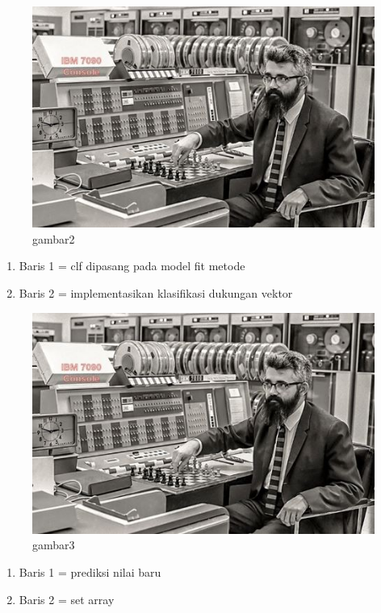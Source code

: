 \begin{figure}[ht]
\centering
\includegraphics[scale=0.7]{figures/contoh.jpg}
\caption{gambar2}
\label{roza2}
\end{figure}

\begin {enumerate}
\item Baris 1 = clf dipasang pada model fit metode
\item Baris 2 =  implementasikan klasifikasi dukungan vektor
\end {enumerate}

\begin{figure}[ht]
\centering
\includegraphics[scale=0.5]{figures/contoh.jpg}
\caption{gambar3}
\label{roza3}
\end{figure}

\begin {enumerate}
\item Baris 1 = prediksi nilai baru
\item Baris 2 = set array
\end {enumerate}


